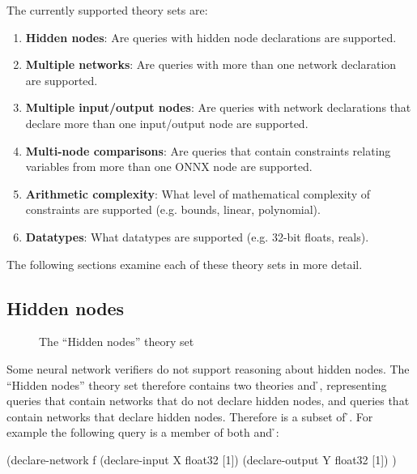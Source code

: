 The currently supported theory sets are:
\begin{enumerate}
\item \textbf{Hidden nodes}: Are queries with hidden node declarations  are supported.
\item \textbf{Multiple networks}: Are queries with more than one network declaration are supported.
\item \textbf{Multiple input/output nodes}: Are queries with network declarations that declare more than one input/output node  are supported.
\item \textbf{Multi-node comparisons}: Are queries that contain constraints relating variables from more than one ONNX node are supported.
\item \textbf{Arithmetic complexity}: What level of mathematical complexity of constraints are supported (e.g. bounds, linear, polynomial). 
\item \textbf{Datatypes}: What datatypes are supported (e.g. 32-bit floats, reals).
\end{enumerate}
The following sections examine each of these theory sets in more detail.

\subsection{Hidden nodes}
\label{sec:hidden-nodes}

\begin{figure}[h]
\centering
{}
\caption{The ``Hidden nodes'' theory set}
\label{fig:hidden-nodes-theory-set}
\end{figure}

Some neural network verifiers do not support reasoning about hidden nodes. The ``Hidden nodes'' theory set therefore contains two theories \nh{} and \h{}, representing queries that contain networks that do not declare hidden nodes, and queries that contain networks that declare hidden nodes. Therefore \nh{} is a subset of \h{}. For example the following query is a member of both \nh{} and \h{}:

\begin{code}[style=lbnf]
(declare-network f
    (declare-input  X float32 [1])
    (declare-output Y float32 [1])
)
\end{code}

